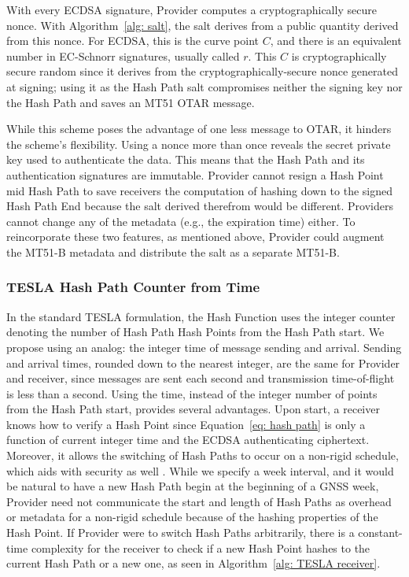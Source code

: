 \documentclass[letterpaper,times]{IONconf/IONconf}
\begin{document}
			With every ECDSA signature, Provider computes a cryptographically secure nonce.
			With Algorithm~\ref{alg: salt}, the salt derives from a public quantity derived from this nonce.
			For ECDSA, this is the curve point $C$, and there is an equivalent number in EC-Schnorr signatures, usually called $r$.
			This $C$ is cryptographically secure random since it derives from the cryptographically-secure nonce generated at signing; using it as the Hash Path salt compromises neither the signing key nor the Hash Path and saves an MT51 OTAR message.

			While this scheme poses the advantage of one less message to OTAR, it hinders the scheme's flexibility.
			Using a nonce more than once reveals the secret private key used to authenticate the data.
			This means that the Hash Path and its authentication signatures are immutable.
			Provider cannot resign a Hash Point mid Hash Path to save receivers the computation of hashing down to the signed Hash Path End because the salt derived therefrom would be different.
			Providers cannot change any of the metadata (e.g., the expiration time) either.
			To reincorporate these two features, as mentioned above, Provider could augment the MT51-B metadata and distribute the salt as a separate MT51-B.

		\subsubsection{TESLA Hash Path Counter from Time} \label{subsub:time_counter}

			In the standard TESLA formulation, the Hash Function uses the integer counter denoting the number of Hash Path Hash Points from the Hash Path start.
			We propose using an analog: the integer time of message sending and arrival.
			Sending and arrival times, rounded down to the nearest integer, are the same for Provider and receiver, since messages are sent each second and transmission time-of-flight is less than a second.
			Using the time, instead of the integer number of points from the Hash Path start, provides several advantages.
			Upon start, a receiver knows how to verify a Hash Point since Equation~\eqref{eq: hash path} is only a function of current integer time and the ECDSA authenticating ciphertext.
			Moreover, it allows the switching of Hash Paths to occur on a non-rigid schedule, which aids with security as well \cite{chain-security}.
			While we specify a week interval, and it would be natural to have a new Hash Path begin at the beginning of a GNSS week, Provider need not communicate the start and length of Hash Paths as overhead or metadata for a non-rigid schedule because of the hashing properties of the Hash Point.
			If Provider were to switch Hash Paths arbitrarily, there is a constant-time complexity for the receiver to check if a new Hash Point hashes to the current Hash Path or a new one, as seen in Algorithm~\ref{alg: TESLA receiver}.
\end{document}
